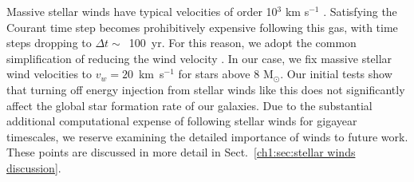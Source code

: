 Massive stellar winds have typical velocities of order 10$^{3}$ km s$^{-1}$ \citep{Leitherer1992}. Satisfying the Courant time step becomes prohibitively expensive following this gas, with time steps dropping to $\Delta t \sim$~100~yr. For this reason, we adopt the common simplification of reducing the wind velocity \citep[e.g][]{Offner2015}. In our case, we fix massive stellar wind velocities to $v_w = 20$~km~s$^{-1}$ for stars above 8 M$_{\odot}$. Our initial tests show that turning off energy injection from stellar winds like this does not significantly affect the global star formation rate of our galaxies. Due to the substantial additional computational expense of following stellar winds for gigayear timescales, we reserve examining the detailed importance of winds to future work. These points are discussed in more detail in Sect.~\ref{ch1:sec:stellar winds discussion}.



